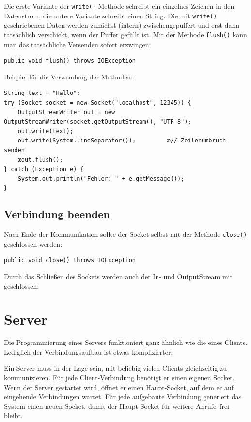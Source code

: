 Die erste Variante der \lstinline|write()|-Methode schreibt ein einzelnes
Zeichen in den Datenstrom, die untere Variante schreibt einen String. Die mit
\lstinline|write()| geschriebenen Daten werden zunächst (intern)
zwischengepuffert und erst dann tatsächlich verschickt, wenn der Puffer gefüllt
ist. Mit der Methode \lstinline|flush()| kann man das tatsächliche Versenden
sofort erzwingen:

\begin{lstlisting}
public void flush() throws IOException
\end{lstlisting}

Beispiel für die Verwendung der Methoden:

\begin{lstlisting}
String text = "Hallo";
try (Socket socket = new Socket("localhost", 12345)) {
    OutputStreamWriter out = new OutputStreamWriter(socket.getOutputStream(), "UTF-8");
    out.write(text);
    out.write(System.lineSeparator());         æ// Zeilenumbruch senden
    æout.flush();
} catch (Exception e) {
    System.out.println("Fehler: " + e.getMessage());
}
\end{lstlisting}

\subsection{Verbindung beenden}

Nach Ende der Kommunikation sollte der Socket selbst mit der Methode
\lstinline|close()| geschlossen werden:

\begin{lstlisting}
public void close() throws IOException
\end{lstlisting}

Durch das Schließen des Sockets werden auch der In- und OutputStream mit
geschlossen.


\section{Server}

Die Programmierung eines Servers funktioniert ganz ähnlich wie die eines
Clients. Lediglich der Verbindungsaufbau ist etwas komplizierter:

Ein Server muss in der Lage sein, mit beliebig vielen Clients gleichzeitig zu
kommunizieren. Für jede Client-Verbindung benötigt er einen eigenen Socket.
Wenn der Server gestartet wird, öffnet er einen Haupt-Socket, auf dem er auf
eingehende Verbindungen wartet. Für jede aufgebaute Verbindung generiert das
System einen neuen Socket, damit der Haupt-Socket für weitere \glqq Anrufe\grqq\
frei bleibt.

